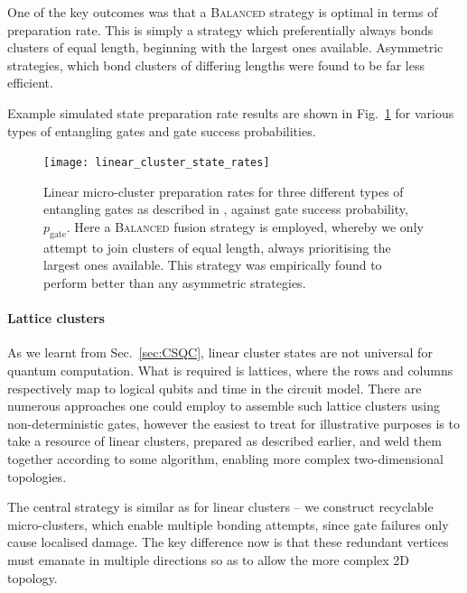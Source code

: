 One of the key outcomes was that a \textsc{Balanced} strategy is optimal in terms of preparation rate. This is simply a strategy which preferentially always bonds clusters of equal length, beginning with the largest ones available. Asymmetric strategies, which bond clusters of differing lengths were found to be far less efficient.

Example simulated state preparation rate results are shown in Fig.~\ref{fig:linear_cluster_state_r} for various types of entangling gates and gate success probabilities.

\begin{figure}[!htbp]
\texttt{[image: linear\_cluster\_state\_rates]}
\captionspacefig \caption{Linear micro-cluster preparation rates for three different types of entangling gates as described in \cite{bib:RohdeBarrett07}, against gate success probability, $p_\mathrm{gate}$. Here a \textsc{Balanced} fusion strategy is employed, whereby we only attempt to join clusters of equal length, always prioritising the largest ones available. This strategy was empirically found to perform better than any asymmetric strategies.}\label{fig:linear_cluster_state_r}
\end{figure}

%
%

\paragraph{Lattice clusters}

As we learnt from Sec.~\ref{sec:CSQC}, linear cluster states are not universal for quantum computation. What is required is lattices, where the rows and columns respectively map to logical qubits and time in the circuit model. There are numerous approaches one could employ to assemble such lattice clusters using non-deterministic gates, however the easiest to treat for illustrative purposes is to take a resource of linear clusters, prepared as described earlier, and weld them together according to some algorithm, enabling more complex two-dimensional topologies.

The central strategy is similar as for linear clusters -- we construct recyclable micro-clusters, which enable multiple bonding attempts, since gate failures only cause localised damage. The key difference now is that these redundant vertices must emanate in multiple directions so as to allow the more complex 2D topology.

